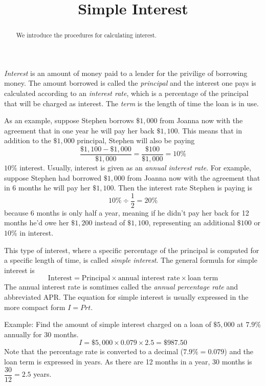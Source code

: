 \documentclass{ximera}
\title{Simple Interest}
\begin{document}
\begin{abstract}
We introduce the procedures for calculating interest.
\end{abstract}
\maketitle


\emph{Interest} is an amount of money paid to a lender for the privilige of borrowing money. The amount borrowed is called the \emph{principal} and the interest one pays is calculated according to an \emph{interest rate}, which is a percentage of the principal that will be charged as interest. The \emph{term} is the length of time the loan is in use.

As an example, suppose Stephen borrows $\$1,000$ from Joanna now with the agreement that in one year he will pay her back $\$1,100$. This means that in addition to the $\$1,000$ principal, Stephen will also be paying
$$
\frac{\$1,100-\$1,000}{\$1,000}=\frac{\$100}{\$1,000}=10\%
$$
$10\%$ interest. Usually, interest is given as an \emph{annual interest rate}. For example, suppose Stephen had borrowed $\$1,000$ from Joanna now with the agreement that in $6$ months he will pay her $\$1,100$. Then the interest rate Stephen is paying is
$$
10\%\div \frac{1}{2}=20\%
$$
because 6 months is only half a year, meaning if he didn't pay her back for 12 months he'd owe her $\$1,200$ instead of $\$1,100$, representing an additional $\$100$ or $10\%$ in interest.

This type of interest, where a specific percentage of the principal is computed for a specific length of time, is called \emph{simple interest}. The general formula for simple interest is
\begin{equation}\label{simpleinterest}
\text{Interest}=\text{Principal}\times\text{annual interest rate}\times\text{loan term}
\end{equation}
The annual interest rate is somtimes called the \emph{annual percentage rate} and abbreviated APR. The equation for simple interest is usually expressed in the more compact form $I=Prt$.

Example: Find the amount of simple interest charged on a loan of $\$5,000$ at $7.9\%$ annually for 30 months.
$$
I=\$5,000\times 0.079\times 2.5=\$987.50
$$
Note that the percentage rate is converted to a decimal ($7.9\%=0.079$) and the loan term is expressed in years. As there are 12 months in a year, 30 months is $\dfrac{30}{12}=2.5$ years.
\end{document}
